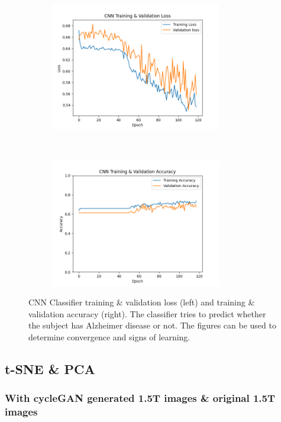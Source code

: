 \documentclass[12pt, fleqn, titlepage]{article}
\newcommand{\1}[1]{\mathds{1}\left[#1\right]}
\begin{document}
\begin{figure}[H]
	\centering
	\begin{subfigure}[t]{0.5\textwidth}
		\centering
		\includegraphics[height=2.2in]{imgs/classifier/lr_0.0002_loss_curve}%
	\end{subfigure}%
	~
	\begin{subfigure}[t]{0.5\textwidth}
	\centering
	\includegraphics[height=2.2in]{imgs/classifier/lr_0.0002_accuracy_curve}%

\end{subfigure}
	\caption{CNN Classifier training \& validation loss (left) and training \& validation accuracy (right). The classifier tries to predict whether the subject has Alzheimer disease or not. The figures can be used to determine convergence and signs of learning. }
		\label{fig:loss_acc}
\end{figure}

\vspace*{-1cm}

\subsection{t-SNE \& PCA}\label{result_dim_reduction}

\subsubsection{With cycleGAN generated 1.5T images \& original 1.5T images }
\end{document}
